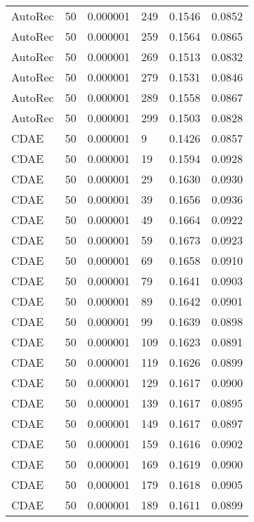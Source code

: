 \begin{tabular}{llrlrr}
 AutoRec &   50 &  0.000001 &   249 &  0.1546 &       0.0852 \\
 AutoRec &   50 &  0.000001 &   259 &  0.1564 &       0.0865 \\
 AutoRec &   50 &  0.000001 &   269 &  0.1513 &       0.0832 \\
 AutoRec &   50 &  0.000001 &   279 &  0.1531 &       0.0846 \\
 AutoRec &   50 &  0.000001 &   289 &  0.1558 &       0.0867 \\
 AutoRec &   50 &  0.000001 &   299 &  0.1503 &       0.0828 \\
    CDAE &   50 &  0.000001 &     9 &  0.1426 &       0.0857 \\
    CDAE &   50 &  0.000001 &    19 &  0.1594 &       0.0928 \\
    CDAE &   50 &  0.000001 &    29 &  0.1630 &       0.0930 \\
    CDAE &   50 &  0.000001 &    39 &  0.1656 &       0.0936 \\
    CDAE &   50 &  0.000001 &    49 &  0.1664 &       0.0922 \\
    CDAE &   50 &  0.000001 &    59 &  0.1673 &       0.0923 \\
    CDAE &   50 &  0.000001 &    69 &  0.1658 &       0.0910 \\
    CDAE &   50 &  0.000001 &    79 &  0.1641 &       0.0903 \\
    CDAE &   50 &  0.000001 &    89 &  0.1642 &       0.0901 \\
    CDAE &   50 &  0.000001 &    99 &  0.1639 &       0.0898 \\
    CDAE &   50 &  0.000001 &   109 &  0.1623 &       0.0891 \\
    CDAE &   50 &  0.000001 &   119 &  0.1626 &       0.0899 \\
    CDAE &   50 &  0.000001 &   129 &  0.1617 &       0.0900 \\
    CDAE &   50 &  0.000001 &   139 &  0.1617 &       0.0895 \\
    CDAE &   50 &  0.000001 &   149 &  0.1617 &       0.0897 \\
    CDAE &   50 &  0.000001 &   159 &  0.1616 &       0.0902 \\
    CDAE &   50 &  0.000001 &   169 &  0.1619 &       0.0900 \\
    CDAE &   50 &  0.000001 &   179 &  0.1618 &       0.0905 \\
    CDAE &   50 &  0.000001 &   189 &  0.1611 &       0.0899 \\

\end{tabular}
